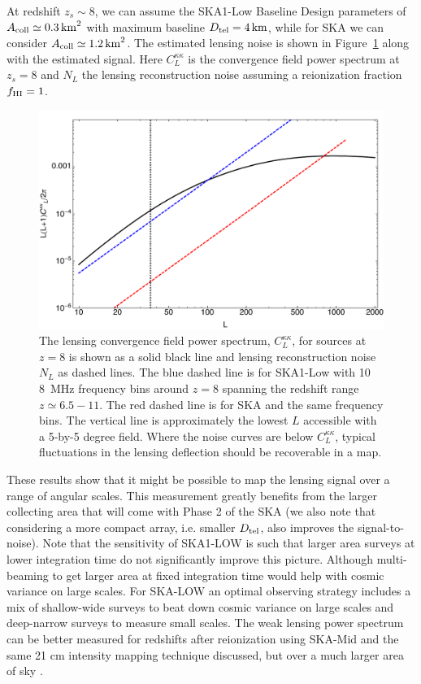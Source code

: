 \documentclass{PoS}
\begin{document}
At redshift $z_s \sim 8$, we can assume the SKA1-Low Baseline Design \citep{Dewdney:2013} parameters of $A_{\rm coll} \simeq 0.3  \, {\rm km}^2$ with maximum baseline $D_{\rm tel}=4 \, {\rm km}$, while for SKA we can consider $A_{\rm coll} \simeq 1.2  \, {\rm km}^2$.
The estimated lensing noise is shown in Figure~\ref{fig:CLNL} along with the estimated signal.  
Here $C^{\kappa \kappa}_L$ is the convergence field power spectrum at $z_s=8$ and $N_L$ the lensing reconstruction noise assuming a reionization fraction $f_{\rm HI}=1$.
\begin{figure}[h]
\centerline{
\includegraphics[scale=0.5]{figures/tomographic_SKA_kappaPS.pdf}
}
\caption{The lensing convergence field power spectrum, $C^{\kappa \kappa}_L$, for sources at $z=8$ is shown as a solid black line and lensing reconstruction noise $N_L$ as dashed lines.  The blue dashed line is for SKA1-Low with 10 8~MHz frequency bins around $z=8$ spanning the redshift range $z \simeq 6.5-11$.  The red dashed line is for SKA and the same frequency bins. The vertical line is approximately the lowest $L$ accessible with a 5-by-5 degree field.  Where the noise curves are below $C^{\kappa \kappa}_L$, typical fluctuations in the lensing deflection should be recoverable in a map. }
\label{fig:CLNL}
\end{figure}

These results show that it might be possible to map the lensing signal over a range of angular scales.  This measurement greatly benefits from the larger collecting area that will come with Phase 2 of the SKA (we also note that  considering a more compact array, i.e. smaller $D_{\rm tel}$, also improves the signal-to-noise).  Note that the sensitivity of SKA1-LOW is such that larger area surveys at lower integration time do not significantly improve this picture. Although multi-beaming to get larger area at fixed integration time would help with cosmic variance on large scales. For SKA-LOW an optimal observing strategy includes a mix of shallow-wide surveys to beat down cosmic variance on large scales and deep-narrow surveys to measure small scales. The weak lensing power spectrum can be better measured for redshifts after reionization using SKA-Mid and the same 21 cm intensity mapping technique discussed, but over a much larger area of sky \citep{PourtsidouMetcalf:2014}.
\end{document}
